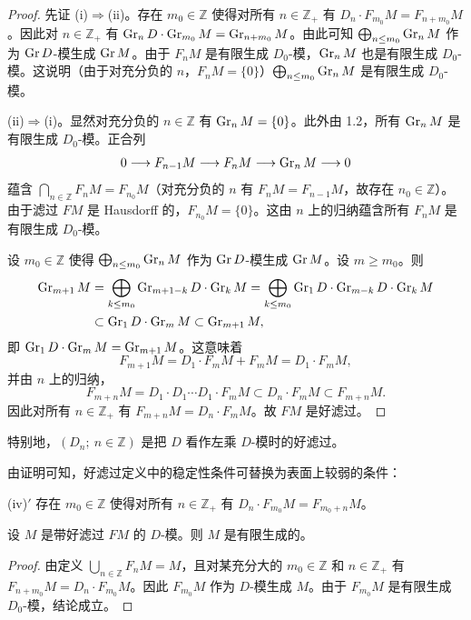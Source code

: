 \begin{proof}
先证 (i)$\Rightarrow$(ii)。存在 $m_0\in\mathbb{Z}$ 使得对所有 $n\in\mathbb{Z}_+$ 有 $D_n\cdot F_{m_0}M=F_{n+m_0}M$。因此对 $n\in\mathbb{Z}_+$ 有 $\operatorname{Gr}_n D\cdot\operatorname{Gr}_{m_0}M=\operatorname{Gr}_{n+m_0}M$。由此可知 $\bigoplus_{n\le m_0}\operatorname{Gr}_n M$ 作为 $\operatorname{Gr} D$-模生成 $\operatorname{Gr} M$。由于 $F_n M$ 是有限生成 $D_0$-模，$\operatorname{Gr}_n M$ 也是有限生成 $D_0$-模。这说明（由于对充分负的 $n$，$F_n M=\{0\}$）$\bigoplus_{n\le m_0}\operatorname{Gr}_n M$ 是有限生成 $D_0$-模。

(ii)$\Rightarrow$(i)。显然对充分负的 $n\in\mathbb{Z}$ 有 $\operatorname{Gr}_n M=\{0\}$。此外由 1.2，所有 $\operatorname{Gr}_n M$ 是有限生成 $D_0$-模。正合列
$$0\longrightarrow F_{n-1}M\longrightarrow F_n M\longrightarrow \operatorname{Gr}_n M\longrightarrow 0$$
蕴含 $\bigcap_{n\in\mathbb{Z}}F_n M=F_{n_0}M$（对充分负的 $n$ 有 $F_n M=F_{n-1}M$，故存在 $n_0\in\mathbb{Z}$）。由于滤过 $F M$ 是 Hausdorff 的，$F_{n_0}M=\{0\}$。这由 $n$ 上的归纳蕴含所有 $F_n M$ 是有限生成 $D_0$-模。

设 $m_0\in\mathbb{Z}$ 使得 $\bigoplus_{n\le m_0}\operatorname{Gr}_n M$ 作为 $\operatorname{Gr} D$-模生成 $\operatorname{Gr} M$。设 $m\ge m_0$。则
\begin{align*}
\operatorname{Gr}_{m+1}M&=\bigoplus_{k\le m_0}\operatorname{Gr}_{m+1-k}D\cdot\operatorname{Gr}_k M
=\bigoplus_{k\le m_0}\operatorname{Gr}_1 D\cdot\operatorname{Gr}_{m-k}D\cdot\operatorname{Gr}_k M\\
&\subset\operatorname{Gr}_1 D\cdot\operatorname{Gr}_m M\subset\operatorname{Gr}_{m+1}M,
\end{align*}
即 $\operatorname{Gr}_1 D\cdot\operatorname{Gr}_m M=\operatorname{Gr}_{m+1}M$。这意味着
$$F_{m+1}M=D_1\cdot F_m M+F_m M=D_1\cdot F_m M,$$
并由 $n$ 上的归纳，
$$F_{m+n}M=D_1\cdot D_1\cdots D_1\cdot F_m M\subset D_n\cdot F_m M\subset F_{m+n}M.$$
因此对所有 $n\in\mathbb{Z}_+$ 有 $F_{m+n}M=D_n\cdot F_m M$。故 $F M$ 是好滤过。
\end{proof}

特别地，$(D_n;\ n\in\mathbb{Z})$ 是把 $D$ 看作左乘 $D$-模时的好滤过。

\begin{remark}
由证明可知，好滤过定义中的稳定性条件可替换为表面上较弱的条件：

(iv)$'$ 存在 $m_0\in\mathbb{Z}$ 使得对所有 $n\in\mathbb{Z}_+$ 有 $D_n\cdot F_{m_0}M=F_{m_0+n}M$。
\end{remark}

\begin{lemma}
设 $M$ 是带好滤过 $F M$ 的 $D$-模。则 $M$ 是有限生成的。
\end{lemma}

\begin{proof}
由定义 $\bigcup_{n\in\mathbb{Z}}F_n M=M$，且对某充分大的 $m_0\in\mathbb{Z}$ 和 $n\in\mathbb{Z}_+$ 有 $F_{n+m_0}M=D_n\cdot F_{m_0}M$。因此 $F_{m_0}M$ 作为 $D$-模生成 $M$。由于 $F_{m_0}M$ 是有限生成 $D_0$-模，结论成立。
\end{proof}

